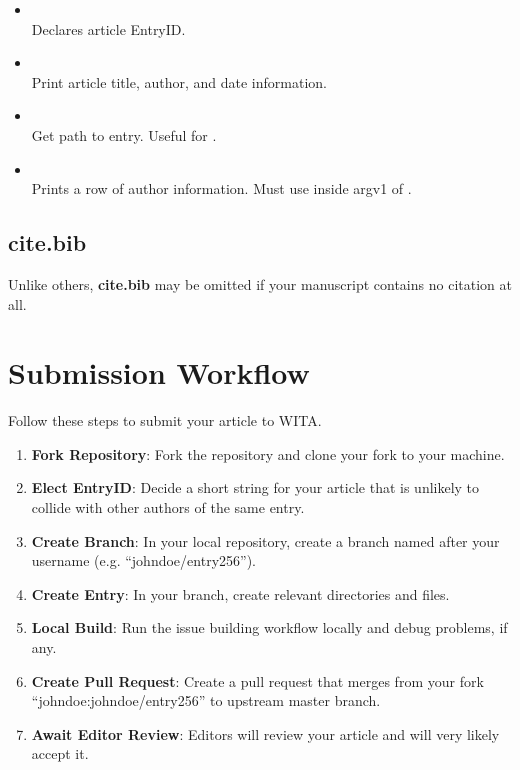 \begin{itemize}
	\raggedright
	\item \texttt{}\\
	      Declares article EntryID.

	\item \texttt{}\\
	      Print article title, author, and date information.

	\item \texttt{}\\
	      Get path to entry. Useful for \texttt{}.

	\item \texttt{}\\
	      Prints a row of author information. Must use inside argv1 of \texttt{}.

\end{itemize}

\subsection{cite.bib}
Unlike others, \textbf{cite.bib} may be omitted if your manuscript contains no citation at all.




\section{Submission Workflow}
Follow these steps to submit your article to WITA.

\begin{enumerate}
	\item \textbf{Fork Repository}: Fork the repository and clone your fork to your machine.
	\item \textbf{Elect EntryID}: Decide a short string for your article that is unlikely to collide with other authors of the same entry.
	\item \textbf{Create Branch}: In your local repository, create a branch named after your username (e.g. ``johndoe/entry256'').
	\item \textbf{Create Entry}: In your branch, create relevant directories and files.
	\item \textbf{Local Build}: Run the issue building workflow locally and debug problems, if any.
	\item \textbf{Create Pull Request}: Create a pull request that merges from your fork ``johndoe:johndoe/entry256'' to upstream master branch.
	\item \textbf{Await Editor Review}: Editors will review your article and will very likely accept it.
\end{enumerate}

